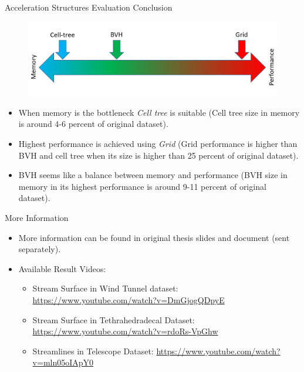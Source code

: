 \documentclass{beamer}
\begin{document}
\begin{frame}{Acceleration Structures Evaluation Conclusion}
	\begin{figure}[ht!]
	\centering
	\includegraphics[height=0.2\textheight]{figures/accelstructsConclusion}
	\end{figure}
	\begin{itemize}
		\item When memory is the bottleneck \textit{Cell tree} is suitable (Cell tree size in memory is around 4-6 percent of original dataset).
		\item Highest performance is achieved using \textit{Grid} (Grid performance is higher than BVH and cell tree when its size is higher than 25 percent of original dataset).
		\item BVH seems like a balance between memory and performance (BVH size in memory in its highest performance is around 9-11 percent of original dataset).
	\end{itemize}
\end{frame}

\begin{frame}{More Information}
	\begin{itemize}
		\item More information can be found in original thesis slides and document (sent separately).
		\item Available Result Videos:
			\begin{itemize}
				\item Stream Surface in Wind Tunnel dataset: \url{https://www.youtube.com/watch?v=DmGjogQDpyE}
				\item Stream Surface in Tethrahedradecal Dataset: \url{https://www.youtube.com/watch?v=rdoRs-VpGhw}
				\item Streamlines in Telescope Dataset: \url{https://www.youtube.com/watch?v=mln05oIApY0}
			\end{itemize}
	\end{itemize}
\end{frame}

\end{document}

